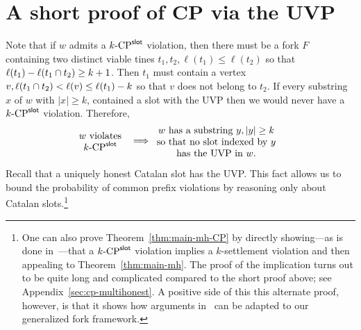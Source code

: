 \section{A short proof of CP via the UVP }\label{sec:cp-proof-via-uvp}

  Note that 
  if $w$ admits a ${k}\text{-}\mathrm{CP}^{\mathsf{slot}}$ violation, 
  then there must be a fork $F$ containing 
  two distinct viable tines $t_1, t_2, \ell(t_1) \leq \ell(t_2)$ 
  so that $\ell(t_1) - \ell(t_1 \cap t_2) \geq k + 1$. 
  Then $t_1$ must contain a vertex $v, \ell(t_1 \cap t_2) < \ell(v) \leq \ell(t_1) - k$ 
  so that $v$ does not belong to $t_2$. 
  If every substring $x$ of $w$ with $|x| \geq k$, contained a slot with the UVP then 
  we would never have a ${k}\text{-}\mathrm{CP}^{\mathsf{slot}}$ violation. 
  Therefore, 
  \begin{align}\label{eq:cp-uvp}
    \parbox{20mm}{\centering $w$ violates $\kSlotCP$}
    &\implies
    \parbox{45mm}{\centering
      $w$ has a substring $y, |y| \geq k$ so that 
      no slot indexed by $y$ has the UVP in $w$.
    }
  \end{align}


  Recall that a uniquely honest Catalan slot has the UVP. 
  This fact allows us to bound 
  the probability of common prefix violations by 
  reasoning only about Catalan slots.\footnote{ 
  One can also prove Theorem~\ref{thm:main-mh-CP} 
  by 
  directly showing---as is done in~\cite{LinearConsistency}---that 
  a ${k}\text{-}\mathrm{CP}^{\mathsf{slot}}$ violation implies a $k$-settlement violation 
  and then appealing to Theorem~\ref{thm:main-mh}. 
  The proof of the implication 
  turns out to be quite long and complicated 
  compared to the short proof above; 
  see Appendix~\ref{sec:cp-multihonest}.
  A positive side of this this alternate proof, however,  
  is that it shows how arguments in~\cite{LinearConsistency} 
  can be adapted to our generalized fork framework.
  }

